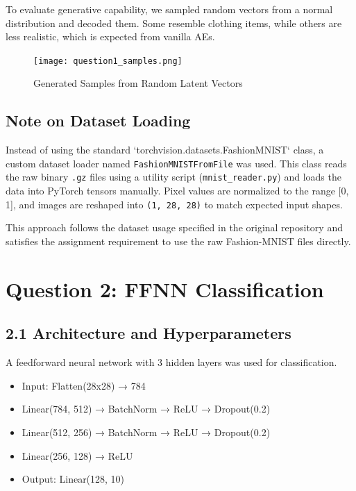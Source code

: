 \documentclass[12pt]{article}
\begin{document}
To evaluate generative capability, we sampled random vectors from a normal distribution and decoded them. Some resemble clothing items, while others are less realistic, which is expected from vanilla AEs.

\begin{figure}[H]
    \centering
    \texttt{[image: question1\_samples.png]}
    \caption{Generated Samples from Random Latent Vectors}
\end{figure}

\subsection*{Note on Dataset Loading}

Instead of using the standard `torchvision.datasets.FashionMNIST` class, a custom dataset loader named \texttt{FashionMNISTFromFile} was used. This class reads the raw binary \texttt{.gz} files using a utility script (\texttt{mnist\_reader.py}) and loads the data into PyTorch tensors manually. Pixel values are normalized to the range [0, 1], and images are reshaped into \texttt{(1, 28, 28)} to match expected input shapes.

This approach follows the dataset usage specified in the original repository and satisfies the assignment requirement to use the raw Fashion-MNIST files directly.


\section*{Question 2: FFNN Classification}

\subsection*{2.1 Architecture and Hyperparameters}

A feedforward neural network with 3 hidden layers was used for classification.

\begin{itemize}
    \item Input: Flatten(28x28) → 784
    \item Linear(784, 512) → BatchNorm → ReLU → Dropout(0.2)
    \item Linear(512, 256) → BatchNorm → ReLU → Dropout(0.2)
    \item Linear(256, 128) → ReLU
    \item Output: Linear(128, 10)
\end{itemize}
\end{document}

